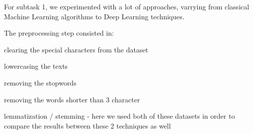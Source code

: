 \documentclass[11pt]{article}
\begin{document}
For subtask 1, we experimented with a lot of approaches, varrying from
classical Machine Learning algorithms to Deep Learning techniques.

The preprocessing step consisted in:

\begin{description}
\item clearing the special characters from the dataset

\item lowercasing the texts

\item removing the stopwords

\item removing the words shorter than 3 character

\item lemmatization / stemming - here we used both of these datasets in
order to compare the results between these 2 techniques as well
\end{description}
\end{document}
